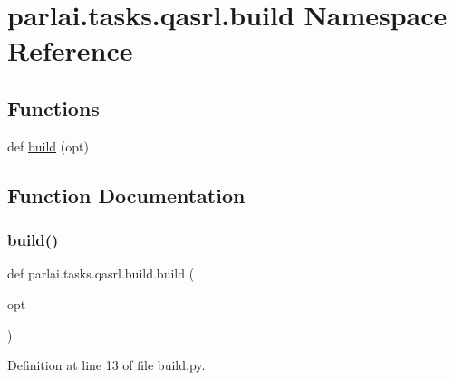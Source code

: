 \hypertarget{namespaceparlai_1_1tasks_1_1qasrl_1_1build}{}\section{parlai.\+tasks.\+qasrl.\+build Namespace Reference}
\label{namespaceparlai_1_1tasks_1_1qasrl_1_1build}
\subsection*{Functions}
\begin{DoxyCompactItemize}
\item 
def \hyperlink{namespaceparlai_1_1tasks_1_1qasrl_1_1build_afe77ee1662611aab5f5520df1fc49ff6}{build} (opt)
\end{DoxyCompactItemize}


\subsection{Function Documentation}
\mbox{\label{namespaceparlai_1_1tasks_1_1qasrl_1_1build_afe77ee1662611aab5f5520df1fc49ff6}} 
\subsubsection{\texorpdfstring{build()}{build()}}
{\footnotesize\ttfamily def parlai.\+tasks.\+qasrl.\+build.\+build (\begin{DoxyParamCaption}\item[{}]{opt }\end{DoxyParamCaption})}



Definition at line 13 of file build.\+py.

